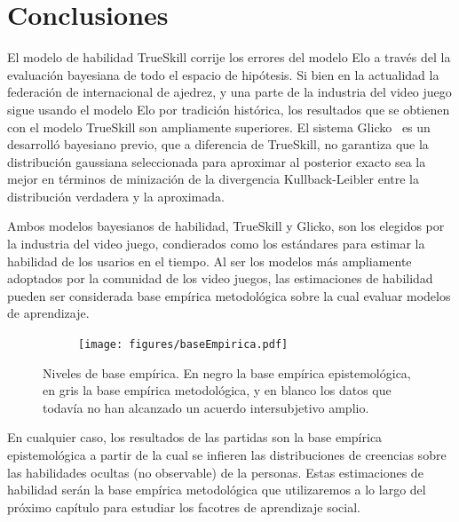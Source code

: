 \documentclass[a4paper,11pt]{book}
\theoremstyle{definition}
\begin{document}
%
%




\section{Conclusiones}

El modelo de habilidad TrueSkill corrije los errores del modelo Elo a través del la evaluación bayesiana de todo el espacio de hipótesis.
%
Si bien en la actualidad la federación de internacional de ajedrez, y una parte de la industria del video juego sigue usando el modelo Elo por tradición histórica, los resultados que se obtienen con el modelo TrueSkill son ampliamente superiores.
%
El sistema Glicko~\cite{Glikman2013} es un desarroll\'o bayesiano previo, que a diferencia de TrueSkill, no garantiza que la distribuci\'on gaussiana seleccionada para aproximar al posterior exacto sea la mejor en términos de minizaci\'on de la divergencia Kullback-Leibler entre la distribuci\'on verdadera y la aproximada.


Ambos modelos bayesianos de habilidad, TrueSkill y Glicko, son los elegidos por la industria del video juego, condierados como los estándares para estimar la habilidad de los usarios en el tiempo.
%
Al ser los modelos más ampliamente adoptados por la comunidad de los video juegos, las estimaciones de habilidad pueden ser considerada base empírica metodológica sobre la cual evaluar modelos de aprendizaje.
\begin{figure}[ht!]
    \centering
    \begin{subfigure}[b]{0.48\textwidth}
    \texttt{[image: figures/baseEmpirica.pdf]}
    \end{subfigure}
    \caption{Niveles de base emp\'irica. En negro la base emp\'irica epistemol\'ogica, en gris la base emp\'irica metodol\'ogica, y en blanco los datos que todav\'ia no han alcanzado un acuerdo intersubjetivo amplio. }
\end{figure}
%
En cualquier caso, los resultados de las partidas son la base emp\'irica epistemol\'ogica a partir de la cual se infieren las distribuciones de creencias sobre las habilidades ocultas (no observable) de la personas.
%
Estas estimaciones de habilidad ser\'an la base emp\'irica metodol\'ogica que utilizaremos a lo largo del próximo capítulo para estudiar los facotres de aprendizaje social.
\end{document}
